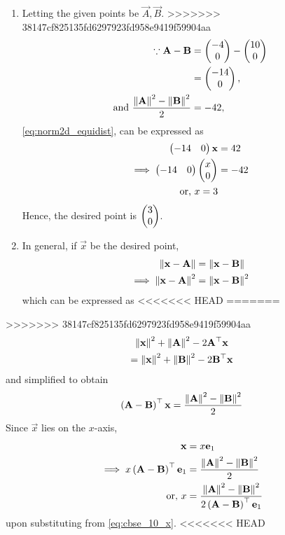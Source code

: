 \documentclass[journal,12pt,twocolumn]{IEEEtran}
\renewcommand\thesection{\arabic{section}}
\begin{document}
\begin{enumerate}[label=\thesection.\arabic*.,ref=\thesection.\theenumi]
\begin{enumerate}
\begin{enumerate}
	\item Letting the given points be $\vec{A},\vec{B}$. 
>>>>>>> 38147cf825135fd6297923fd958e9419f59904aa
		\begin{align}
	\because  \mathbf{A}-\mathbf{B} &= \begin{pmatrix} -4 \\ 0\end{pmatrix}-\begin{pmatrix}10 \\ 0\end{pmatrix}
	  \\
	  &= \begin{pmatrix} -14 \\ 0\end{pmatrix},
	  \\
			\text{and }	   \frac{\left\lVert\mathbf{A}\right\rVert^2 - \left\lVert\mathbf{B}\right\rVert^2}{2} &= -42,
  \end{align}
  \eqref{eq:norm2d_equidist}, can be expressed as 
  \begin{align}
	  \begin{pmatrix} -14 & 0\end{pmatrix}\mathbf{x} 
	  &=  42
	  \\
	  \implies 
	  \begin{pmatrix} -14 & 0\end{pmatrix}\begin{pmatrix}x \\ 0\end{pmatrix} 
	  &=  -42
	  \\
	  \text{or, } x =3 
  \end{align}
  Hence, the desired point is $\begin{pmatrix} 3 \\ 0\end{pmatrix}$.
\item In general, if $\vec{x}$ be the desired point, 
  \begin{align}
	  \left\lVert\mathbf{x}-\mathbf{A}\right\rVert
	  &=
	  \left\lVert\mathbf{x}-\mathbf{B}\right\rVert
	  \\
	  \implies \left\lVert\mathbf{x}-\mathbf{A}\right\rVert^2
	  &=
	  \left\lVert\mathbf{x}-\mathbf{B}\right\rVert^2
  \end{align}
  which can be expressed as 
<<<<<<< HEAD
=======
  \end{enumerate}
>>>>>>> 38147cf825135fd6297923fd958e9419f59904aa
  \begin{multline}
	  \left\lVert\mathbf{x}\right\rVert^2+\left\lVert\mathbf{A}\right\rVert^2 - 2 \mathbf{A}^{\top }\mathbf{x}
	  \\
	  =
	  \left\lVert\mathbf{x}\right\rVert^2+\left\lVert\mathbf{B}\right\rVert^2 - 2 \mathbf{B}^{\top }\mathbf{x}
  \end{multline}
  and simplified to obtain 
  \begin{align}
	  \label{eq:cbse_10_x}
	   \left(\mathbf{A}-\mathbf{B}\right)^{\top }\mathbf{x}
	  =
	  \frac{\left\lVert\mathbf{A}\right\rVert^2 -\left\lVert\mathbf{B}\right\rVert^2 }{2}
  \end{align}
  Since $\vec{x}$ lies on the $x$-axis, 
  \begin{align}
	  \mathbf{x} &=
	   x\mathbf{e}_1
	  \\
	  \implies 
	   x\left(\mathbf{A}-\mathbf{B}\right)^{\top }\mathbf{e}_1
		  &=
	  \frac{\left\lVert\mathbf{A}\right\rVert^2 -\left\lVert\mathbf{B}\right\rVert^2 }{2}
	  \\
	  \text{or, } x &=\frac{\left\lVert\mathbf{A}\right\rVert^2 -\left\lVert\mathbf{B}\right\rVert^2 }{2\left(\mathbf{A}-\mathbf{B}\right)^{\top }\mathbf{e}_1
}
  \end{align}
	  upon substituting from \eqref{eq:cbse_10_x}.
<<<<<<< HEAD



\end{enumerate}
\end{enumerate}
\end{document}
